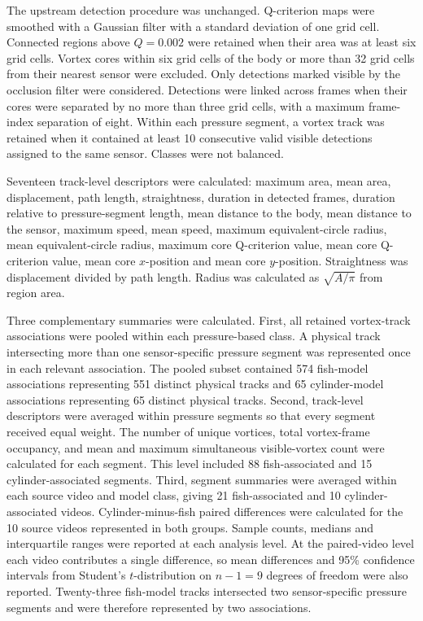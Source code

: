 \documentclass[11pt,a4paper]{article}
\begin{document}
The upstream detection procedure was unchanged. Q-criterion maps were smoothed with a Gaussian filter with a standard deviation of one grid cell. Connected regions above $Q=0.002$ were retained when their area was at least six grid cells. Vortex cores within six grid cells of the body or more than 32 grid cells from their nearest sensor were excluded. Only detections marked visible by the occlusion filter were considered. Detections were linked across frames when their cores were separated by no more than three grid cells, with a maximum frame-index separation of eight. Within each pressure segment, a vortex track was retained when it contained at least 10 consecutive valid visible detections assigned to the same sensor. Classes were not balanced.

Seventeen track-level descriptors were calculated: maximum area, mean area, displacement, path length, straightness, duration in detected frames, duration relative to pressure-segment length, mean distance to the body, mean distance to the sensor, maximum speed, mean speed, maximum equivalent-circle radius, mean equivalent-circle radius, maximum core Q-criterion value, mean core Q-criterion value, mean core $x$-position and mean core $y$-position. Straightness was displacement divided by path length. Radius was calculated as $\sqrt{A/\pi}$ from region area.

Three complementary summaries were calculated. First, all retained vortex-track associations were pooled within each pressure-based class. A physical track intersecting more than one sensor-specific pressure segment was represented once in each relevant association. The pooled subset contained 574 fish-model associations representing 551 distinct physical tracks and 65 cylinder-model associations representing 65 distinct physical tracks. Second, track-level descriptors were averaged within pressure segments so that every segment received equal weight. The number of unique vortices, total vortex-frame occupancy, and mean and maximum simultaneous visible-vortex count were calculated for each segment. This level included 88 fish-associated and 15 cylinder-associated segments. Third, segment summaries were averaged within each source video and model class, giving 21 fish-associated and 10 cylinder-associated videos. Cylinder-minus-fish paired differences were calculated for the 10 source videos represented in both groups. Sample counts, medians and interquartile ranges were reported at each analysis level. At the paired-video level each video contributes a single difference, so mean differences and 95\% confidence intervals from Student's $t$-distribution on $n-1=9$ degrees of freedom were also reported. Twenty-three fish-model tracks intersected two sensor-specific pressure segments and were therefore represented by two associations.
\end{document}
